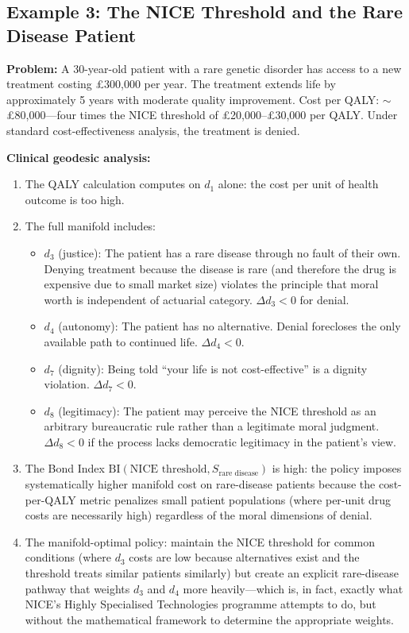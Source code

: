 \documentclass[12pt]{article}
\theoremstyle{definition}
\theoremstyle{remark}
\newcommand{\BI}{\mathrm{BI}}              %
\begin{document}
\subsection{Example 3: The NICE Threshold and the Rare Disease Patient}

\textbf{Problem:} A 30-year-old patient with a rare genetic disorder has access to a new treatment costing \pounds300,000 per year.  The treatment extends life by approximately 5 years with moderate quality improvement.  Cost per QALY: $\sim$\pounds80,000---four times the NICE threshold of \pounds20,000--\pounds30,000 per QALY.  Under standard cost-effectiveness analysis, the treatment is denied.

\textbf{Clinical geodesic analysis:}
\begin{enumerate}
    \item The QALY calculation computes on $d_1$ alone: the cost per unit of health outcome is too high.
    \item The full manifold includes:
    \begin{itemize}
        \item $d_3$ (justice): The patient has a rare disease through no fault of their own.  Denying treatment because the disease is rare (and therefore the drug is expensive due to small market size) violates the principle that moral worth is independent of actuarial category.  $\Delta d_3 < 0$ for denial.
        \item $d_4$ (autonomy): The patient has no alternative.  Denial forecloses the only available path to continued life.  $\Delta d_4 < 0$.
        \item $d_7$ (dignity): Being told ``your life is not cost-effective'' is a dignity violation.  $\Delta d_7 < 0$.
        \item $d_8$ (legitimacy): The patient may perceive the NICE threshold as an arbitrary bureaucratic rule rather than a legitimate moral judgment.  $\Delta d_8 < 0$ if the process lacks democratic legitimacy in the patient's view.
    \end{itemize}
    \item The Bond Index $\BI(\text{NICE threshold}, S_{\text{rare disease}})$ is high: the policy imposes systematically higher manifold cost on rare-disease patients because the cost-per-QALY metric penalizes small patient populations (where per-unit drug costs are necessarily high) regardless of the moral dimensions of denial.
    \item The manifold-optimal policy: maintain the NICE threshold for common conditions (where $d_3$ costs are low because alternatives exist and the threshold treats similar patients similarly) but create an explicit rare-disease pathway that weights $d_3$ and $d_4$ more heavily---which is, in fact, exactly what NICE's Highly Specialised Technologies programme attempts to do, but without the mathematical framework to determine the appropriate weights.
\end{enumerate}
\end{document}
